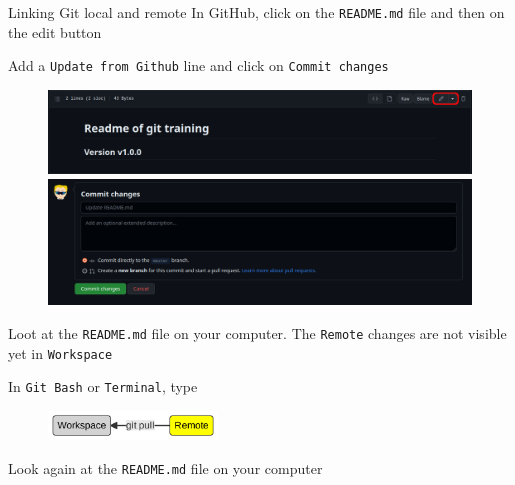 \documentclass[10pt]{beamer}
\begin{document}
\begin{frame}[fragile]{Linking Git local and remote}
\protect\hypertarget{synchronization-from-the-remote}{}
In GitHub, click on the \texttt{README.md} file and then on the edit
button

Add a \texttt{Update\ from\ Github} line and click on
\texttt{Commit\ changes}

\begin{figure}

\begin{minipage}[b]{0.45\linewidth}

{\centering

\includegraphics[width=\textwidth]{img/readme-edit.png}

}

\end{minipage}%
%
\begin{minipage}[b]{0.45\linewidth}

{\centering

\includegraphics[width=\textwidth]{img/readme-edit-2.png}

}

\end{minipage}%

\end{figure}

Loot at the \verb+README.md+ file on your computer. The \texttt{Remote} changes are not visible yet in
\texttt{Workspace}

In \texttt{Git\ Bash} or \texttt{Terminal}, type 

\begin{center}
\begin{figure}[H]
     \includegraphics[width=0.4\textwidth]{mermaid/mermaid-figure-13.png}
     \end{figure}
\end{center}

Look again at the \verb+README.md+ file on your computer


\end{frame}
\end{document}
